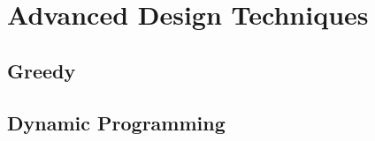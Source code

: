 \documentclass[11pt,fleqn]{book} %
\begin{document}






\part{Advanced Design Techniques}

\chapter{Greedy}



\chapter{Dynamic Programming}















\end{document}

